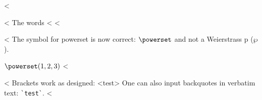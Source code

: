 <%

<%
The words <%
<%

<%
The symbol for powerset is now correct: $\powerset$ and not a Weierstrass p ($\wp$).

$\powerset({1,2,3})$
<%

<%
Brackets work as designed:
<test>
One can also input backquotes in verbatim text: \verb|`test`|.
<%
